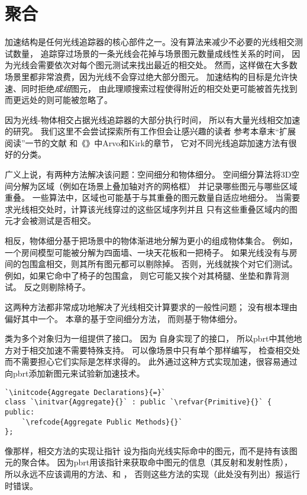 \section{聚合}\label{sec:聚合}

加速结构是任何光线追踪器的核心部件之一。没有算法来减少不必要的光线相交测试数量，
追踪穿过场景的一条光线会花掉与场景图元数量成线性关系的时间，
因为光线会需要依次对每个图元测试来找出最近的相交处。
然而，这样做在大多数场景里都非常浪费，因为光线不会穿过绝大部分图元。
加速结构的目标是允许快速、同时拒绝\emph{成组}图元，
由此理顺搜索过程使得附近的相交处更可能被首先找到而更远处的则可能被忽略了。

因为光线-物体相交占据光线追踪器的大部分执行时间，
所以有大量光线相交加速的研究。
我们这里不会尝试探索所有工作但会让感兴趣的读者
参考本章末“扩展阅读”一节的文献
和《》\citep{10.5555/94788}中Arvo和Kirk的章节，
它对不同光线追踪加速方法有很好的分类。

广义上说，有两种方法解决该问题：空间细分和物体细分。
空间细分算法将3D空间分解为区域（例如在场景上叠加轴对齐的网格框）
并记录哪些图元与哪些区域重叠。
一些算法中，区域也可能基于与其重叠的图元数量自适应地细分。
当需要求光线相交处时，计算该光线穿过的这些区域序列并且
只有这些重叠区域内的图元才会被测试是否相交。

相反，物体细分基于把场景中的物体渐进地分解为更小的组成物体集合。
例如，一个房间模型可能被分解为四面墙、一块天花板和一把椅子。
如果光线没有与房间的包围盒相交，则其所有图元都可以剔除掉。
否则，光线就挨个对它们测试。
例如，如果它命中了椅子的包围盒，
则它可能又挨个对其椅腿、坐垫和靠背测试。
反之则剔除椅子。

这两种方法都非常成功地解决了光线相交计算要求的一般性问题；
没有根本理由偏好其中一个。
本章的基于空间细分方法，
而则基于物体细分。

类为多个对象归为一组提供了接口。
因为
自身实现了的接口，
所以pbrt中其他地方对于相交加速不需要特殊支持。
可以像场景中只有单个那样编写，
检查相交处而不需要担心它们实际是怎样求得的。
此外通过这种方式实现加速，很容易通过向pbrt添加新图元来试验新加速技术。
\begin{lstlisting}
`\initcode{Aggregate Declarations}{=}`
class `\initvar{Aggregate}{}` : public `\refvar{Primitive}{}` {
public:
    `\refcode{Aggregate Public Methods}{}`
};
\end{lstlisting}

像那样，相交方法的实现让指针\linebreak
{}设为指向光线实际命中的图元，而不是持有该图元的聚合体。
因为pbrt用该指针来获取命中图元的信息（其反射和发射性质），
所以永远不应该调用的方法、和
，
否则这些方法的实现（此处没有列出）报运行时错误。